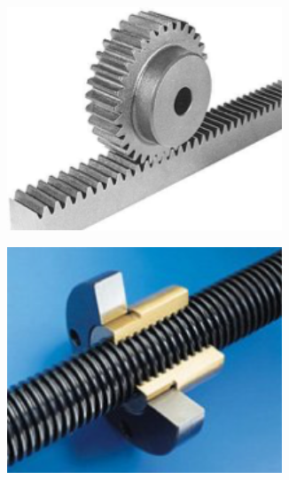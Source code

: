 \documentclass[10pt,fleqn]{article} %
\begin{document}
\begin{figure}[h]
  \begin{subfigure}{0.25\textwidth}
    \centering
    \includegraphics[width=0.9\textwidth,height=.1\textheight,keepaspectratio]{images/cremaillere}
    \caption{}
  \end{subfigure}\hfill
  \begin{subfigure}{.25\textwidth}
    \centering
    \includegraphics[width=0.9\textwidth,height=.1\textheight,keepaspectratio]{images/vis_ecrou}
    \caption{}
  \end{subfigure}\hfill
  \begin{subfigure}{0.25\textwidth}
    \centering

\end{subfigure}
\end{figure}
\end{document}
